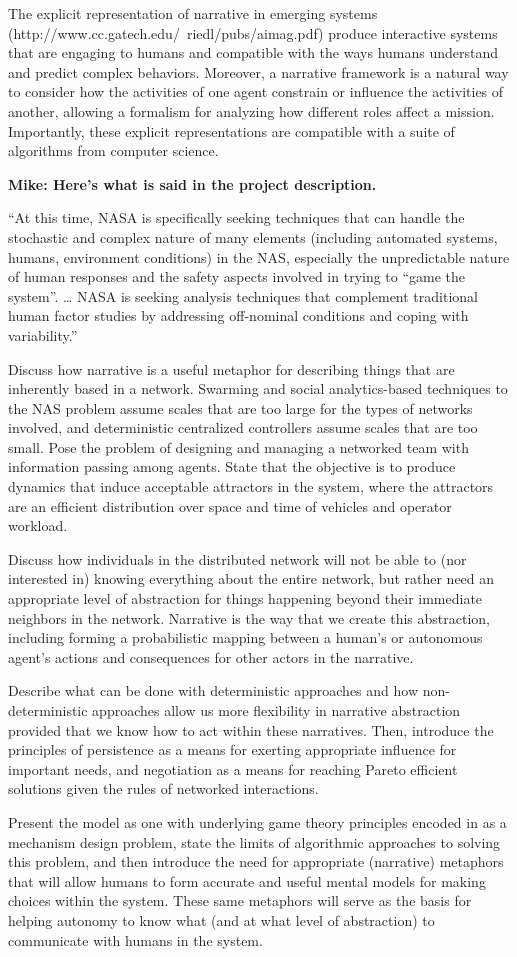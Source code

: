 The explicit representation of narrative in emerging systems
(http://www.cc.gatech.edu/~riedl/pubs/aimag.pdf) produce interactive
systems that are engaging to humans and compatible with the ways
humans understand and predict complex behaviors.  Moreover, a
narrative framework is a natural way to consider how the activities of
one agent constrain or influence the activities of another, allowing a
formalism for analyzing how different roles affect a mission.
Importantly, these explicit representations are compatible with a
suite of algorithms from computer science.

\textbf{Mike: Here’s what is said in the project description.}

“At this time, NASA is specifically seeking techniques that can handle
the stochastic and complex nature of many elements (including
automated systems, humans, environment conditions) in the NAS,
especially the unpredictable nature of human responses and the safety
aspects involved in trying to “game the system”. … NASA is seeking
analysis techniques that complement traditional human factor studies
by addressing off-nominal conditions and coping with variability.”

Discuss how narrative is a useful metaphor for describing things that
are inherently based in a network.  Swarming and social
analytics-based techniques to the NAS problem assume scales that are
too large for the types of networks involved, and deterministic
centralized controllers assume scales that are too small.  Pose the
problem of designing and managing a networked team with information
passing among agents.  State that the objective is to produce dynamics
that induce acceptable attractors in the system, where the attractors
are an efficient distribution over space and time of vehicles and
operator workload.

Discuss how individuals in the distributed network will not be able to
(nor interested in) knowing everything about the entire network, but
rather need an appropriate level of abstraction for things happening
beyond their immediate neighbors in the network.  Narrative is the way
that we create this abstraction, including forming a probabilistic
mapping between a human’s or autonomous agent’s actions and
consequences for other actors in the narrative.

Describe what can be done with deterministic approaches and how
non-deterministic approaches allow us more flexibility in narrative
abstraction provided that we know how to act within these narratives.
Then, introduce the principles of persistence as a means for exerting
appropriate influence for important needs, and negotiation as a means
for reaching Pareto efficient solutions given the rules of networked
interactions.

Present the model as one with underlying game theory principles
encoded in as a mechanism design problem, state the limits of
algorithmic approaches to solving this problem, and then introduce the
need for appropriate (narrative) metaphors that will allow humans to
form accurate and useful mental models for making choices within the
system.  These same metaphors will serve as the basis for helping
autonomy to know what (and at what level of abstraction) to
communicate with humans in the system.

